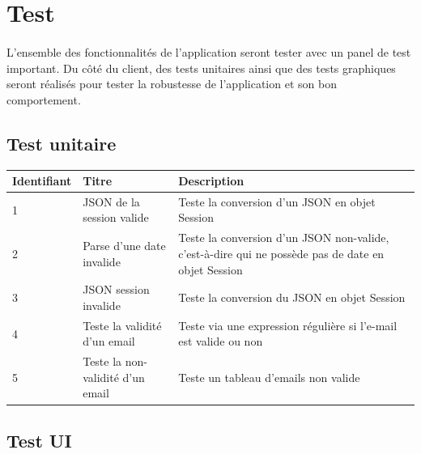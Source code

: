 \documentclass[titlepage, 12pt]{report}
\begin{document}
\clearpage


\section{Test}

\paragraph{}L'ensemble des fonctionnalités de l'application seront tester avec un panel de test important. Du côté du client, des tests unitaires ainsi que des tests graphiques seront réalisés pour tester la robustesse de l'application et son bon comportement.

\subsection{Test unitaire}

\begin{table}[ht]
\begin{tabularx}{\textwidth}{|X|X|X|}
\hline
Identifiant & Titre & Description \\
\hline
1 & JSON de la session valide & Teste la conversion d'un JSON en objet Session \\
\hline
2 & Parse d'une date invalide & Teste la conversion d'un JSON non-valide, c'est-à-dire qui ne possède pas de date en objet Session \\
\hline
3 & JSON session invalide & Teste la conversion du JSON en objet Session \\
\hline
4 & Teste la validité d'un email & Teste via une expression régulière si l'e-mail est valide ou non \\
\hline
5 & Teste la non-validité d'un email & Teste un tableau d'emails non valide \\
\hline \hline
\end{tabularx}
\end{table}

\subsection{Test UI}
\end{document}
